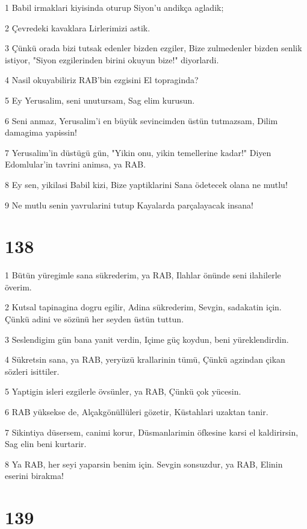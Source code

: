 \par 1 Babil irmaklari kiyisinda oturup Siyon'u andikça agladik;
\par 2 Çevredeki kavaklara Lirlerimizi astik.
\par 3 Çünkü orada bizi tutsak edenler bizden ezgiler, Bize zulmedenler bizden senlik istiyor, "Siyon ezgilerinden birini okuyun bize!" diyorlardi.
\par 4 Nasil okuyabiliriz RAB'bin ezgisini El topraginda?
\par 5 Ey Yerusalim, seni unutursam, Sag elim kurusun.
\par 6 Seni anmaz, Yerusalim'i en büyük sevincimden üstün tutmazsam, Dilim damagima yapissin!
\par 7 Yerusalim'in düstügü gün, "Yikin onu, yikin temellerine kadar!" Diyen Edomlular'in tavrini animsa, ya RAB.
\par 8 Ey sen, yikilasi Babil kizi, Bize yaptiklarini Sana ödetecek olana ne mutlu!
\par 9 Ne mutlu senin yavrularini tutup Kayalarda parçalayacak insana!

\chapter{138}

\par 1 Bütün yüregimle sana sükrederim, ya RAB, Ilahlar önünde seni ilahilerle överim.
\par 2 Kutsal tapinagina dogru egilir, Adina sükrederim, Sevgin, sadakatin için. Çünkü adini ve sözünü her seyden üstün tuttun.
\par 3 Seslendigim gün bana yanit verdin, Içime güç koydun, beni yüreklendirdin.
\par 4 Sükretsin sana, ya RAB, yeryüzü krallarinin tümü, Çünkü agzindan çikan sözleri isittiler.
\par 5 Yaptigin isleri ezgilerle övsünler, ya RAB, Çünkü çok yücesin.
\par 6 RAB yüksekse de, Alçakgönüllüleri gözetir, Küstahlari uzaktan tanir.
\par 7 Sikintiya düsersem, canimi korur, Düsmanlarimin öfkesine karsi el kaldirirsin, Sag elin beni kurtarir.
\par 8 Ya RAB, her seyi yaparsin benim için. Sevgin sonsuzdur, ya RAB, Elinin eserini birakma!

\chapter{139}

